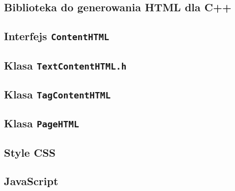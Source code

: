 \documentclass[archivemode]{mgr}
\begin{document}
\newpage
\clearpage %
\begin{appendices}
\chapter{Biblioteka do generowania HTML dla C++ \label{ch_code_snippets}}
%
\section{Interfejs \texttt{ContentHTML}}

%
\section{Klasa \texttt{TextContentHTML.h}}


%
\section{Klasa \texttt{TagContentHTML}}


%
\section{Klasa \texttt{PageHTML}}


%
\section{Style CSS}

\section{JavaScript}

\end{appendices}
\clearpage
\listoffigures
\clearpage
\listoftables
\end{document}
